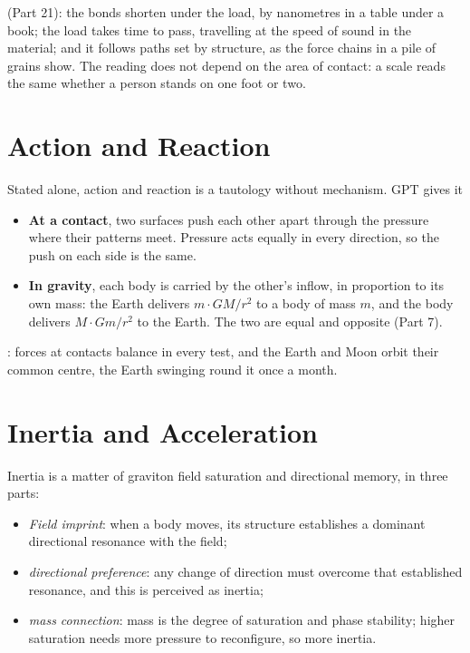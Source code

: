 \documentclass[11pt,a4paper]{article}
\begin{document}
 (Part 21): the bonds shorten under the load, by nanometres in a table under a book; the load takes time to pass, travelling at the speed of sound in the material; and it follows paths set by structure, as the force chains in a pile of grains show. The reading does not depend on the area of contact: a scale reads the same whether a person stands on one foot or two.

\section{Action and Reaction}

Stated alone, action and reaction is a tautology without mechanism. GPT gives it 
\begin{itemize}
\item \textbf{At a contact}, two surfaces push each other apart through the pressure where their patterns meet. Pressure acts equally in every direction, so the push on each side is the same.
\item \textbf{In gravity}, each body is carried by the other's inflow, in proportion to its own mass: the Earth delivers $m\cdot GM/r^2$ to a body of mass $m$, and the body delivers $M\cdot Gm/r^2$ to the Earth. The two are equal and opposite (Part 7).
\end{itemize}
: forces at contacts balance in every test, and the Earth and Moon orbit their common centre, the Earth swinging round it once a month.

\section{Inertia and Acceleration}

Inertia is a matter of graviton field saturation and directional memory, in three parts:
\begin{itemize}
\item \textit{Field imprint}: when a body moves, its structure establishes a dominant directional resonance with the field;
\item \textit{directional preference}: any change of direction must overcome that established resonance, and this is perceived as inertia;
\item \textit{mass connection}: mass is the degree of saturation and phase stability; higher saturation needs more pressure to reconfigure, so more inertia.
\end{itemize}
\end{document}
